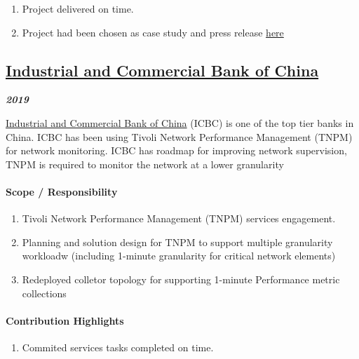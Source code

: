 \documentclass[
]{article}
\providecommand{\tightlist}{%
  \setlength{\itemsep}{0pt}\setlength{\parskip}{0pt}}
\begin{document}
\begin{enumerate}
\def\labelenumi{\arabic{enumi}.}
\tightlist
\item
  Project delivered on time.
\item
  Project had been chosen as case study and press release
  \href{https://www.ibm.com/case-studies/time-dotcom/}{here}
\end{enumerate}

\hypertarget{industrial-and-commercial-bank-of-china}{%
\subsection{\texorpdfstring{\href{http://www.icbc-ltd.com/icbcltd/en/}{Industrial
and Commercial Bank of
China}}{Industrial and Commercial Bank of China}}\label{industrial-and-commercial-bank-of-china}}

\textbf{\emph{2019}}

\href{http://www.icbc-ltd.com/icbcltd/en/}{Industrial and Commercial
Bank of China} (ICBC) is one of the top tier banks in China. ICBC has
been using Tivoli Network Performance Management (TNPM) for network
monitoring. ICBC has roadmap for improving network supervision, TNPM is
required to monitor the network at a lower granularity

\hypertarget{scope-responsibility-3}{%
\paragraph{Scope / Responsibility}\label{scope-responsibility-3}}

\begin{enumerate}
\def\labelenumi{\arabic{enumi}.}
\tightlist
\item
  Tivoli Network Performance Management (TNPM) services engagement.
\item
  Planning and solution design for TNPM to support multiple granularity
  workloadw (including 1-minute granularity for critical network
  elements)
\item
  Redeployed colletor topology for supporting 1-minute Performance
  metric collections
\end{enumerate}

\hypertarget{contribution-highlights-2}{%
\paragraph{Contribution Highlights}\label{contribution-highlights-2}}

\begin{enumerate}
\def\labelenumi{\arabic{enumi}.}
\tightlist
\item
  Commited services tasks completed on time.
\end{enumerate}
\end{document}
